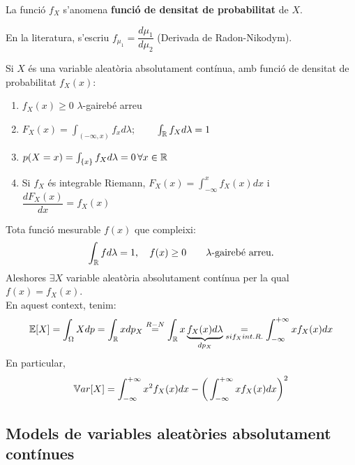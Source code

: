 \begin{defi}
  La funció $f_{X}$ s'anomena \textbf{funció de densitat de probabilitat} de $X$.
\end{defi}

\begin{obs}
  En la literatura, s'escriu $f_{\mu_{1}}=\dfrac{d\mu_{1}}{d\mu_{2}}$ (Derivada de Radon-Nikodym).
\end{obs}

\newpage

\begin{prop}
  Si $X$ és una variable aleatòria absolutament contínua, amb funció de densitat de probabilitat $f_{X}(x)$:
  \begin{enumerate}
      \item $f_{X}(x)\geq0$ $\lambda$-gairebé arreu
      \item $F_{X}(x)=\int_{(-\infty,x)}f_{x}d\lambda$; $\qquad \int_{\mathbb{R}}f_{X}d\lambda=1$
      \item $p(X=x)=\int_{\left\{x\right\}}f_{X}d\lambda=0 \, \forall x \in \mathbb{R}$
      \item Si $f_{X}$ és integrable Riemann, $F_{X}(x)=\int_{-\infty}^{x}f_{X}(x)dx$ i $\dfrac{dF_{X}(x)}{dx}=f_{X}(x)$
  \end{enumerate}
\end{prop}

\begin{obs}
  Tota funció mesurable $f(x)$ que compleixi: 
  \[
    \int_{\mathbb{R}}fd\lambda=1, \quad f(x)\geq 0 \qquad \lambda \text{-gairebé arreu.}
  \]
  Aleshores $\exists X$ variable aleatòria absolutament contínua per la qual $f(x)=f_{X}(x)$. \\
  En aquest context, tenim:
  \[
    \mathbb{E}[X]= \int_{\Omega}Xdp = \int_{\mathbb{R}}xdp_{X} \overset{R-N}{=}\int_{\mathbb{R}}x\underbrace{f_{X}(x)d\lambda}_{dp_{X}} 
    \underset{si f_{X} int. R.}{=} \int_{-\infty}^{+\infty}xf_{X}(x)dx
  \]
  En particular,
  \[
    \mathbb{V} ar[X] = \int_{-\infty}^{+\infty}x^{2}f_{X}(x)dx - \bigg( \int_{-\infty}^{+\infty}xf_{X}(x)dx \bigg)^{2}
  \]
\end{obs}

\subsection{Models de variables aleatòries absolutament contínues}

